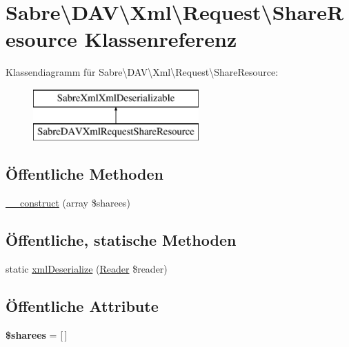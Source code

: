 \hypertarget{class_sabre_1_1_d_a_v_1_1_xml_1_1_request_1_1_share_resource}{}\section{Sabre\textbackslash{}D\+AV\textbackslash{}Xml\textbackslash{}Request\textbackslash{}Share\+Resource Klassenreferenz}
\label{class_sabre_1_1_d_a_v_1_1_xml_1_1_request_1_1_share_resource}
Klassendiagramm für Sabre\textbackslash{}D\+AV\textbackslash{}Xml\textbackslash{}Request\textbackslash{}Share\+Resource\+:\begin{figure}[H]
\begin{center}
\leavevmode
\includegraphics[height=2.000000cm]{class_sabre_1_1_d_a_v_1_1_xml_1_1_request_1_1_share_resource}
\end{center}
\end{figure}
\subsection*{Öffentliche Methoden}
\begin{DoxyCompactItemize}
\item 
\mbox{\hyperlink{class_sabre_1_1_d_a_v_1_1_xml_1_1_request_1_1_share_resource_a16cd8e612168680292152ce302f1a43e}{\+\_\+\+\_\+construct}} (array \$sharees)
\end{DoxyCompactItemize}
\subsection*{Öffentliche, statische Methoden}
\begin{DoxyCompactItemize}
\item 
static \mbox{\hyperlink{class_sabre_1_1_d_a_v_1_1_xml_1_1_request_1_1_share_resource_aee1943104644bf11bc6fe23121cde9db}{xml\+Deserialize}} (\mbox{\hyperlink{class_sabre_1_1_xml_1_1_reader}{Reader}} \$reader)
\end{DoxyCompactItemize}
\subsection*{Öffentliche Attribute}
\begin{DoxyCompactItemize}
\item 
\mbox{\label{class_sabre_1_1_d_a_v_1_1_xml_1_1_request_1_1_share_resource_aaf902e4200dff7a7089557eee1cde50c}} 
{\bfseries \$sharees} = \mbox{[}$\,$\mbox{]}
\end{DoxyCompactItemize}


